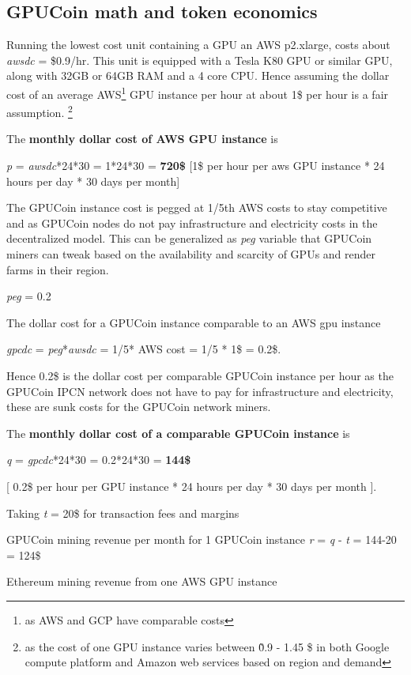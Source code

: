 \subsection{GPUCoin math and token economics}
Running the lowest cost unit containing a GPU an AWS p2.xlarge, costs about \emph{awsdc} = \$0.9/hr. This unit is equipped with a Tesla K80 GPU or similar GPU, along with 32GB or 64GB RAM and a 4 core CPU. 
Hence assuming the dollar cost of an average AWS\footnote{as AWS and GCP have comparable costs} GPU instance per hour at about 1\$ per hour is a fair assumption. \footnote{ as the cost of one GPU instance varies between \~ 0.9 - 1.45 \$ in both Google compute platform and Amazon web services based on region and demand}

The \textbf{monthly dollar cost of AWS GPU instance} is

\emph{p} = \emph{awsdc}*24*30 = 1*24*30 = \textbf{720\$  } [1\$ per hour per aws GPU instance * 24 hours per day * 30 days per month]


The GPUCoin instance cost is pegged at 1/5th AWS costs to stay competitive and as GPUCoin nodes do not pay infrastructure and electricity costs in the decentralized model. This can be generalized as \emph{peg} variable that GPUCoin miners can tweak based on the availability and scarcity of GPUs and render farms in their region.

\emph{peg} = 0.2

The dollar cost for a GPUCoin instance comparable to an AWS gpu instance 

\emph{gpcdc} = \emph{peg}*\emph{awsdc} =  1/5* AWS cost = 1/5 * 1\$ = 0.2\$.

Hence 0.2\$ is the dollar cost per comparable GPUCoin instance per hour as the GPUCoin IPCN network does not have to pay for infrastructure and electricity, these are sunk costs for the GPUCoin network miners.

The \textbf{monthly dollar cost of a comparable GPUCoin instance} is 

\emph{q} = \emph{gpcdc}*24*30 = 0.2*24*30 = \textbf{144\$ }

[ 0.2\$ per hour per GPU instance * 24 hours per day * 30 days per month ].


Taking \emph{t} = 20\$ for transaction fees and margins

GPUCoin mining revenue per month for 1 GPUCoin instance
\emph{r} = \emph{q} - \emph{t} = 144-20 = 124\$

Ethereum mining revenue from one AWS GPU instance

